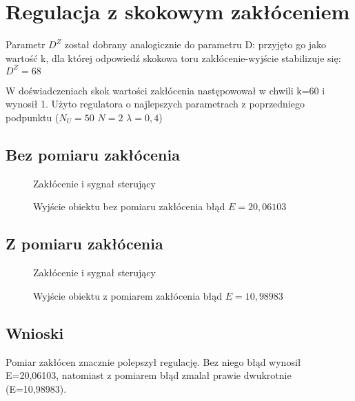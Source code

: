 \chapter{Regulacja z skokowym zakłóceniem}

Parametr $D^Z$ został dobrany analogicznie do parametru D: przyjęto go jako wartość k, dla której odpowiedź skokowa toru zakłócenie-wyjście stabilizuje się:
$D^Z=68$

W doświadczeniach skok wartości zakłócenia następowował w chwili k=60 i wynosił 1. Użyto regulatora o najlepszych parametrach z poprzedniego podpunktu ($N_U=50$ $N=2$ $\lambda=0,4$)

\section{Bez pomiaru zakłócenia}

\begin{figure}[H]
\centering

\caption{Zakłócenie i sygnał sterujący}
\end{figure}

\begin{figure}[H]
\centering

\caption{Wyjście obiektu bez pomiaru zakłócenia błąd $E=20,06103$}
\end{figure}

\section{Z pomiaru zakłócenia}

\begin{figure}[H]
\centering

\caption{Zakłócenie i sygnał sterujący}
\end{figure}

\begin{figure}[H]
\centering

\caption{Wyjście obiektu z pomiarem zakłócenia błąd $E=10,98983$}
\end{figure}

\section{Wnioski}
Pomiar zakłócen znacznie polepszył regulację. Bez niego błąd wynosił E=20,06103, natomiast z pomiarem błąd zmalał prawie dwukrotnie (E=10,98983).
\smallskip

